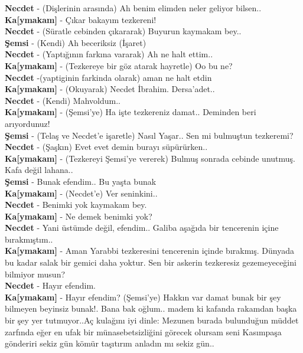 \documentclass[]{book}
\begin{document}
\textbf{Necdet} - (Dişlerinin arasında) Ah benim elimden neler geliyor bilsen..\\
\textbf{Ka{[}ymakam{]}} - Çıkar bakayım tezkereni!\\
\textbf{Necdet} - (Süratle cebinden çıkararak) Buyurun kaymakam bey..\\
\textbf{Şemsi} - (Kendi) Ah beceriksiz (İşaret)\\
\textbf{Necdet} - (Yaptığının farkına vararak) Ah ne halt ettim..\\
\textbf{Ka{[}ymakam{]}} - (Tezkereye bir göz atarak hayretle) Oo bu ne?\\
\textbf{Necdet} -(yaptiginin farkinda olarak) aman ne halt etdin\\
\textbf{Ka{[}ymakam{]}} - (Okuyarak) Necdet İbrahim. Dersa'adet..\\
\textbf{Necdet} - (Kendi) Mahvoldum..\\
\textbf{Ka{[}ymakam{]}} - (Şemsi'ye) Ha işte tezkereniz damat.. Deminden beri arıyordunuz!\\
\textbf{Şemsi} - (Telaş ve Necdet'e işaretle) Nasıl Yaşar.. Sen mi bulmuştun tezkeremi?\\
\textbf{Necdet} - (Şaşkın) Evet evet demin burayı süpürürken..\\
\textbf{Ka{[}ymakam{]}} - (Tezkereyi Şemsi'ye vererek) Bulmuş sonrada cebinde unutmuş. Kafa değil lahana..\\
\textbf{Şemsi} - Bunak efendim.. Bu yaşta bunak\\
\textbf{Ka{[}ymakam{]}} - (Necdet'e) Ver seninkini..\\
\textbf{Necdet} - Benimki yok kaymakam bey.\\
\textbf{Ka{[}ymakam{]}} - Ne demek benimki yok?\\
\textbf{Necdet} - Yani üstümde değil, efendim.. Galiba aşağıda bir tencerenin içine bırakmıştım..\\
\textbf{Ka{[}ymakam{]}} - Aman Yarabbi tezkeresini tencerenin içinde bırakmış. Dünyada bu kadar salak bir gemici daha yoktur. Sen bir askerin tezkeresiz gezemeyeceğini bilmiyor musun?\\
\textbf{Necdet} - Hayır efendim.\\
\textbf{Ka{[}ymakam{]}} - Hayır efendim? (Şemsi'ye) Hakkın var damat bunak bir şey bilmeyen beyinsiz bunak!. Bana bak oğlum.. madem ki kafanda rakamdan başka bir şey yer tutmuyor..Aç kulağını iyi dinle: Mezunen burada bulunduğun müddet zarfında eğer en ufak bir münasebetsizliğini görecek olursam seni Kasımpaşa gönderiri sekiz gün kömür taşıtırım anladın mı sekiz gün..\\
\end{document}
